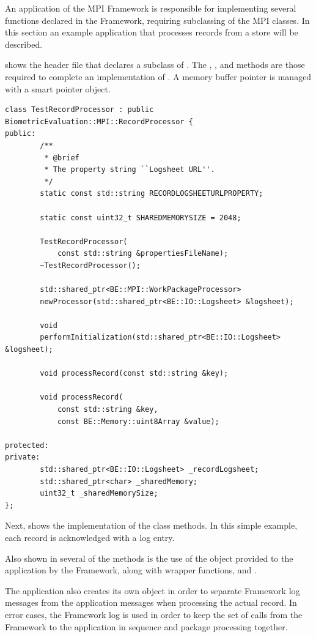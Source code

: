 An application of the MPI Framework is responsible for implementing several
functions declared in the Framework, requiring subclassing of the MPI classes.
In this section an example application that processes records from a store will
be described. 

 shows the header file that declares a subclass of
. The ,
, and  methods are those
required to complete an implementation of .
A memory buffer pointer is managed with a smart pointer object.

\begin{lstlisting}[caption={MPI Framework Application Classes}, label=lst:mpiappclasses]
class TestRecordProcessor : public BiometricEvaluation::MPI::RecordProcessor {
public:
        /**
         * @brief
         * The property string ``Logsheet URL''.
         */
        static const std::string RECORDLOGSHEETURLPROPERTY;

        static const uint32_t SHAREDMEMORYSIZE = 2048;

        TestRecordProcessor(
            const std::string &propertiesFileName);
        ~TestRecordProcessor();

        std::shared_ptr<BE::MPI::WorkPackageProcessor>
        newProcessor(std::shared_ptr<BE::IO::Logsheet> &logsheet);

        void
        performInitialization(std::shared_ptr<BE::IO::Logsheet> &logsheet);

        void processRecord(const std::string &key);

        void processRecord(
            const std::string &key,
            const BE::Memory::uint8Array &value);

protected:
private:
        std::shared_ptr<BE::IO::Logsheet> _recordLogsheet;
        std::shared_ptr<char> _sharedMemory;
        uint32_t _sharedMemorySize;
};

\end{lstlisting}

Next,  shows the implementation of the class methods. In
this simple example, each record is acknowledged with a log entry.

Also shown in several of the methods is the use of the  object
provided to the application by the Framework, along with wrapper functions,
 and .

The application also creates its own
 object in order to separate Framework log messages from the
application messages when processing the actual record. In error cases, the
Framework log is used in order to keep the set of calls from the Framework
to the application in sequence and package processing together.

